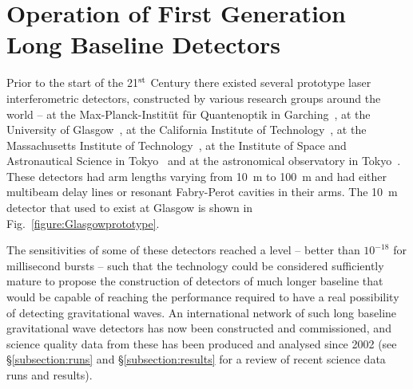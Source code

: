 \documentclass{article}
\begin{document}
\newpage

\section{Operation of First Generation Long Baseline Detectors}
\label{section:construction}

Prior to the start of the 21$^{\rm st}$ Century there existed several prototype
laser interferometric detectors, constructed by various research groups around
the world -- at the Max-Planck-Instit\"ut f\"ur Quantenoptik in
Garching~\cite{Shoemaker}, at the University of Glasgow~\cite{Robertson}, at the
California Institute of Technology~\cite{Abramovici}, at the Massachusetts
Institute of Technology~\cite{Fritschel2}, at the Institute of Space and
Astronautical Science in Tokyo~\cite{Mizuno} and at the astronomical observatory
in Tokyo~\cite{Araya}. These detectors had arm lengths varying from 10~m to
100~m and had either multibeam delay lines or resonant Fabry-Perot cavities in
their arms.  The 10~m detector that used to exist at Glasgow is shown in
Fig.~\ref{figure:Glasgowprototype}.


The sensitivities of some of these detectors reached a level -- better than
$10^{-18}$ for millisecond bursts -- such that the technology could be
considered sufficiently mature to propose the construction of detectors of much
longer baseline that would be capable of reaching the performance required to
have a real possibility of detecting gravitational waves.  An international
network of such long baseline gravitational wave detectors has now been
constructed and commissioned, and science quality data from these has been
produced and analysed since 2002 (see \S\ref{subsection:runs} and
\S\ref{subsection:results} for a review of recent science data runs and results).
\end{document}
